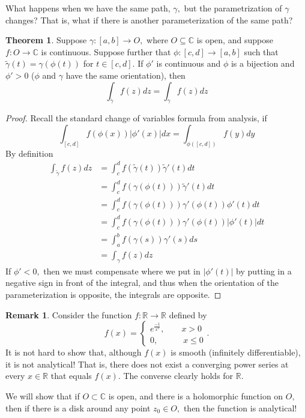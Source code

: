 \documentclass[10pt, oneside]{article}
\newcommand{\bbR}{\mathbb{R}}
\newcommand{\bbC}{\mathbb{C}}
\theoremstyle{definition}
\newtheorem{thm}{Theorem}
\newtheorem{rem}{Remark}
\begin{document}
What happens when we have the same path, $\gamma,$ but the parametrization of $\gamma$ changes? That is, what if there is another parameterization of the same path? 

\begin{thm}
    Suppose $\gamma: [a,b] \to O,$ where $O\subseteq \bbC$ is open, and suppose $f: O \to \bbC$ is continuous. Suppose further that $\phi: [c,d] \to [a,b]$ such that $\tilde{\gamma}(t) = \gamma(\phi(t))$ for $t\in [c,d].$ If $\phi'$ is continuous and $\phi$ is a bijection and $\phi' >0$ ($\phi$ and $\gamma$ have the same orientation), then 
    \[\int_{\tilde{\gamma}} f(z)dz = \int_\gamma f(z)dz\]
\end{thm}

\begin{proof}
Recall the standard change of variables formula from analysis, if
\[\int_{[c,d]} f(\phi(x))|\phi'(x)|dx = \int_{\phi([c,d])}f(y)dy\]
    By definition
    \begin{align*}
        \int_{\tilde{\gamma}} f(z)dz &= \int_c^d f(\tilde{\gamma}(t))\tilde{\gamma}'(t) dt\\
        &= \int_c^d f(\gamma(\phi(t)))\tilde{\gamma}'(t)dt\\
        &= \int_c^d f(\gamma(\phi(t)))\gamma'(\phi(t))\phi'(t)dt\\
        &= \int_c^d f(\gamma(\phi(t)))\gamma'(\phi(t))|\phi'(t)|dt\\
        &= \int_a^b f(\gamma(s))\gamma'(s)ds\\
        &= \int_\gamma f(z)dz
    \end{align*}
If $\phi' < 0,$ then we must compensate where we put in $|\phi'(t)|$ by putting in a negative sign in front of the integral, and thus when the orientation of the parameterization is opposite, the integrals are opposite.
\end{proof}


\begin{rem}
    Consider the function $f: \bbR \to \bbR$ defined by 
    \[f(x) = \begin{cases}
        e^\frac{-1}{x^2}, \qquad x >0\\
        0, \qquad \quad x\leq 0
    \end{cases}.\] It is not hard to show that, although $f(x)$ is smooth (infinitely differentiable), it is not analytical! That is, there does not exist a converging power series at every $x\in \bbR$ that equals $f(x).$ The converse clearly holds for $\bbR.$

    We will show that if $O \subset \bbC$ is open, and there is a holomorphic function on $O,$ then if there is a disk around any point $z_0 \in O,$ then the function is analytical!
\end{rem}
\end{document}

